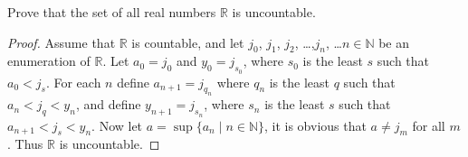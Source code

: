 \documentclass[addpoints]{exam}
\begin{document}
\begin{questions}
\question[3] Prove that the set of all real numbers $\mathbb{R}$ is uncountable.

\begin{solution}
\begin{proof}
Assume that $\mathbb{R}$ is countable, and let $j_{0}$, $j_{1}$, $j_{2}$, …,$j_{n}$, …$n\in \mathbb{N}$ be an enumeration of $\mathbb{R}$. Let $a_{0}=j_{0}$ and $y_{0}=j_{s_{0}}$, where $s_{0}$ is the least $s$ such that $a_{0}<j_{s}$. For each $n$ define $a_{n+1}=j_{q_{n}}$ where $q_{n}$ is the least $q$ such that $a_{n}<j_{q}<y_{n}$, and define $y_{n+1}=j_{s_{n}}$, where $s_{n}$ is the least $s$ such that $a_{n+1}<j_{s}<y_{n}$. Now let $a=\sup\{a_{n}\mid n\in\mathbb{N}\}$, it is obvious that $a\neq j_{m}$ for all $m$. Thus $\mathbb{R}$ is uncountable.
\end{proof}
\end{solution}



\end{questions}
\end{document}
